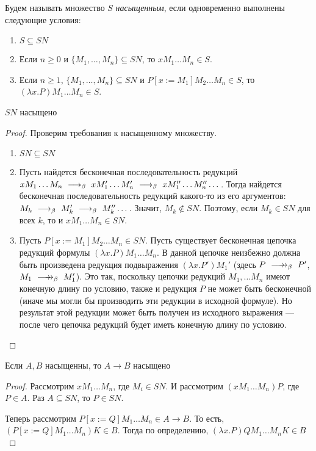 \begin{definition}
Будем называть множество $S$ \emph{насыщенным}, если одновременно выполнены следующие условия:
\begin{enumerate}
\item $S \subseteq SN$
\item Если $n \ge 0$ и $\{M_1, \dots, M_n\} \subseteq SN$, то $x M_1 \dots M_n \in S$.
\item Если $n \ge 1$, $\{M_1, \dots, M_n\} \subseteq SN$ и 
$P [x := M_1] M_2 \dots M_n \in S$, то $(\lambda x.P) M_1 \dots M_n \in S$.
\end{enumerate}
\end{definition}

\begin{lemma} $SN$ насыщено
\end{lemma}
\begin{proof} Проверим требования к насыщенному множеству.
\begin{enumerate}
\item $SN \subseteq SN$
\item Пусть найдется бесконечная последовательность редукций 
$x M_1 \dots M_n \ \longrightarrow_\beta\  x M'_1 \dots M'_n \ \longrightarrow_\beta\  x M''_1 \dots M''_n \dots$.
Тогда найдется бесконечная последовательность редукций какого-то из его аргументов:
$M_k \ \longrightarrow_\beta\  M'_k \ \longrightarrow_\beta\  M''_k \dots$. Значит, $M_k \notin SN$. Поэтому,
если $M_k \in SN$ для всех $k$, то и $x M_1 \dots M_n \in SN$.
\item Пусть $P [x := M_1] M_2 \dots M_n \in SN$. 
Пусть существует бесконечная цепочка редукций формулы $(\lambda x.P) M_1 \dots M_n$. 
В данной цепочке неизбежно должна быть произведена редукция подвыражения $(\lambda x.P') M_1'$
(здесь $P \ \longrightarrow\!\!\!\!\rightarrow_\beta\  P'$, $M_1 \ \longrightarrow\!\!\!\!\rightarrow_\beta\  M_1'$). Это так, поскольку цепочки редукций 
$M_1, \dots M_n$ имеют конечную длину по условию, также и редукция $P$ не может быть
бесконечной (иначе мы могли бы производить эти редукции в исходной формуле).
Но результат этой редукции может быть получен из исходного выражения --- после чего
цепочка редукций будет иметь конечную длину по условию.
\end{enumerate}
\end{proof}

\begin{lemma} Если $A,B$ насыщенны, то $A \rightarrow B$ насыщено \end{lemma}
\begin{proof} Рассмотрим $x M_1 \dots M_n$, где $M_i \in SN$. И рассмотрим $(x M_1 \dots M_n) P$,
где $P \in A$. Раз $A \subseteq SN$, то $P \in SN$.

Теперь рассмотрим $P[x := Q] M_1 \dots M_n \in A\rightarrow B$. То есть,
$(P[x := Q] M_1 \dots M_n) K \in B$. Тогда по определению, $(\lambda x.P) Q M_1 \dots M_n K \in B$
\end{proof}

